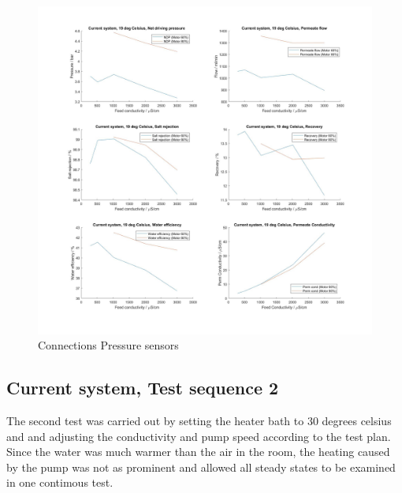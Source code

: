 \begin{figure}[H]
    \centering
    \includegraphics[width=1.1\textwidth]{Key20}
    \caption{Connections Pressure sensors}
    \label{fig:PressConn}
\end{figure}

\newpage

\subsection{Current system, Test sequence 2}

The second test was carried out by setting the heater bath to 30 degrees celsius and and adjusting the conductivity and pump speed according to the test plan. Since the water was much warmer than the air in the room, the heating caused by the pump was not as prominent and allowed all steady states to be examined in one contimous test.

